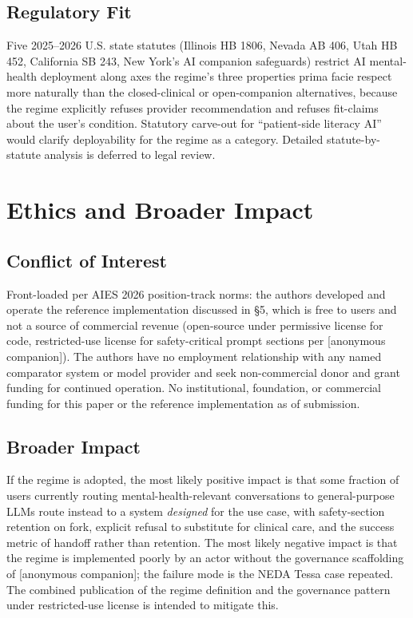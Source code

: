 \documentclass[letterpaper]{article}
\begin{document}
\subsection{Regulatory Fit}

Five 2025--2026 U.S. state statutes (Illinois HB 1806, Nevada AB 406, Utah HB 452, California SB 243, New York's AI companion safeguards) restrict AI mental-health deployment along axes the regime's three properties prima facie respect more naturally than the closed-clinical or open-companion alternatives, because the regime explicitly refuses provider recommendation and refuses fit-claims about the user's condition. Statutory carve-out for ``patient-side literacy AI'' would clarify deployability for the regime as a category. Detailed statute-by-statute analysis is deferred to legal review.

\section{Ethics and Broader Impact}

\subsection{Conflict of Interest}

Front-loaded per AIES 2026 position-track norms: the authors developed and operate the reference implementation discussed in \S5, which is free to users and not a source of commercial revenue (open-source under permissive license for code, restricted-use license for safety-critical prompt sections per {[}anonymous companion{]}). The authors have no employment relationship with any named comparator system or model provider and seek non-commercial donor and grant funding for continued operation. No institutional, foundation, or commercial funding for this paper or the reference implementation as of submission.

\subsection{Broader Impact}

If the regime is adopted, the most likely positive impact is that some fraction of users currently routing mental-health-relevant conversations to general-purpose LLMs route instead to a system \emph{designed} for the use case, with safety-section retention on fork, explicit refusal to substitute for clinical care, and the success metric of handoff rather than retention. The most likely negative impact is that the regime is implemented poorly by an actor without the governance scaffolding of {[}anonymous companion{]}; the failure mode is the NEDA Tessa case repeated. The combined publication of the regime definition and the governance pattern under restricted-use license is intended to mitigate this.
\end{document}
